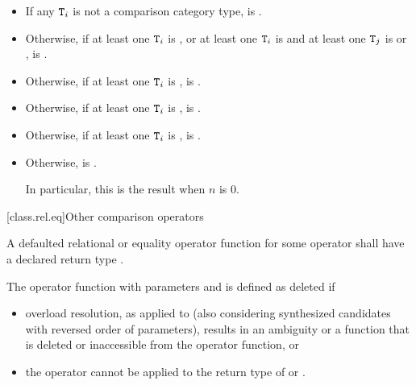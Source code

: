 \begin{itemize}
\item
If any $\texttt{T}_i$
is not a comparison category type,
 is .

\item
Otherwise, if
at least one $\texttt{T}_i$ is , or
at least one $\texttt{T}_i$ is  and
at least one $\texttt{T}_j$ is  or
                              ,
 is .

\item
Otherwise, if at least one $\texttt{T}_i$ is ,
 is .

\item
Otherwise, if at least one $\texttt{T}_i$ is ,
 is .

\item
Otherwise, if at least one $\texttt{T}_i$ is ,
 is .

\item
Otherwise,  is .
\begin{note}
In particular, this is the result when $n$ is 0.
\end{note}
\end{itemize}

[class.rel.eq]{Other comparison operators}
%
%
%

\pnum
A defaulted relational or equality operator function
for some operator 
shall have a declared return type .

\pnum
The operator function with parameters  and 
is defined as deleted if

\begin{itemize}
\item
overload resolution,
as applied to 
(also considering synthesized candidates with reversed order of parameters),
results in an ambiguity
or a function that is deleted or inaccessible from the operator function,
or

\item
the operator 
cannot be applied to the return type of  or .
\end{itemize}

